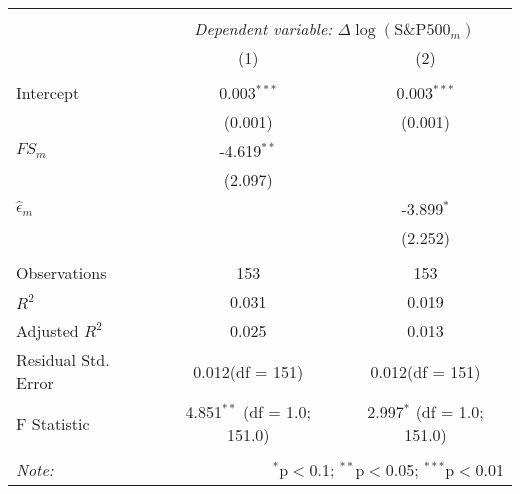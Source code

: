 \begin{tabular}{@{\extracolsep{5pt}}lcc}
\\[-1.8ex]\hline
\hline \\[-1.8ex]
& \multicolumn{2}{c}{\textit{Dependent variable:} \(\Delta \log{(\text{S\&P500}_m)}\)} \
\cr \cline{2-3}
\\[-1.8ex] & (1) & (2) \\
\hline \\[-1.8ex]
 Intercept & 0.003$^{***}$ & 0.003$^{***}$ \\
  & (0.001) & (0.001) \\
 \(FS_m\) & -4.619$^{**}$ & \\
  & (2.097) & \\
 \(\hat{\epsilon}_m\) & & -3.899$^{*}$ \\
  & & (2.252) \\
\hline \\[-1.8ex]
 Observations & 153 & 153 \\
 $R^2$ & 0.031 & 0.019 \\
 Adjusted $R^2$ & 0.025 & 0.013 \\
 Residual Std. Error & 0.012(df = 151) & 0.012(df = 151)  \\
 F Statistic & 4.851$^{**}$ (df = 1.0; 151.0) & 2.997$^{*}$ (df = 1.0; 151.0) \\
\hline
\hline \\[-1.8ex]
\textit{Note:} & \multicolumn{2}{r}{$^{*}$p$<$0.1; $^{**}$p$<$0.05; $^{***}$p$<$0.01} \\
\end{tabular}